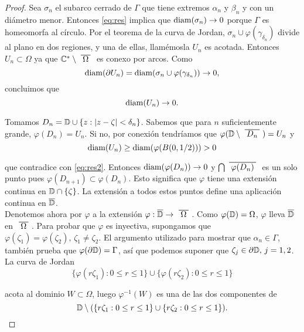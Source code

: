 \begin{proof}
    Sea $\sigma_n$ el subarco cerrado de $\Gamma$ que tiene extremos $\alpha_n$ y $\beta_n$ y con un diámetro menor. Entonces \eqref{eq:res} implica que $\operatorname{diam}(\sigma_n) \to 0$ porque $\Gamma$ es homeomorfa al círculo. Por el teorema de la curva de Jordan, $\sigma_n \cup \varphi(\gamma_{\delta_n})$ divide al plano en dos regiones, y una de ellas, llamémosla $U_n$ es acotada. Entonces $U_n \subset \Omega$ ya que $\complex^* \setminus \xbar{\Omega}$ es conexo por arcos. Como
    \begin{equation}
        \operatorname{diam}(\partial U_n) = \operatorname{diam}(\sigma_n \cup \varphi(\gamma_{\delta_n})) \to 0,
    \end{equation}
    concluimos que
    \begin{equation}
        \label{eq:res2}
        \operatorname{diam}(U_n) \to 0.
    \end{equation}

    Tomamos $D_n = \mathbb{D} \cup \{ z: \left\lvert z - \zeta\right\rvert < \delta_n \}$. Sabemos que para $n$ suficientemente grande, $\varphi(D_n) = U_n$. Si no, por conexión tendríamos que $\varphi(\disk \setminus \xbar{D_n}) = U_n$ y
    \begin{equation*}
        \operatorname{diam} (U_n) \geq \operatorname{diam} (\varphi(B(0, 1/2))) > 0
    \end{equation*}

    que contradice con \eqref{eq:res2}. Entonces $\operatorname{diam}(\varphi(D_n)) \to 0$ y $\bigcap \xbar{\varphi(D_n)}$ es un solo punto pues $\varphi(D_{n+1}) \subset \varphi(D_n)$. Esto significa que $\varphi$ tiene una extensión continua en $\mathbb{D} \cap \{ \zeta \}$. La extensión a todos estos puntos define una aplicación continua en $\overline{\mathbb{D}}$. \\

    Denotemos ahora por $\varphi$ a la extensión $\varphi : \closedisk \to \xbar{\Omega}$. Como $\varphi(\mathbb{D}) = \Omega$, $\varphi$ lleva  $\overline{\mathbb{D}}$ en $\xbar{\Omega}$. Para probar que $\varphi$ es inyectiva, supongamos que $\varphi(\zeta_1) = \varphi(\zeta_2), \, \zeta_1 \not = \zeta_2$. El argumento utilizado para mostrar que $\alpha_n \in \Gamma$, también prueba que $\varphi (\partial \mathbb{D}) = \Gamma$, así que podemos suponer que $\zeta_j \in \partial \mathbb{D}, \, j=1, 2$. La curva de Jordan
    \begin{equation*}
        \{\varphi (r \zeta_1) : 0 \leq r \leq 1\} \cup \{\varphi (r \zeta_2) : 0 \leq r \leq 1\}
    \end{equation*}

    acota al dominio $W \subset \Omega$, luego $\varphi ^{-1} (W)$ es una de las dos componentes de
    \begin{equation*}
        \mathbb{D} \setminus ( \{ r \zeta_1 : 0 \leq r \leq 1\} \cup \{ r \zeta_2 : 0 \leq r \leq 1\}).
    \end{equation*}


\end{proof}

